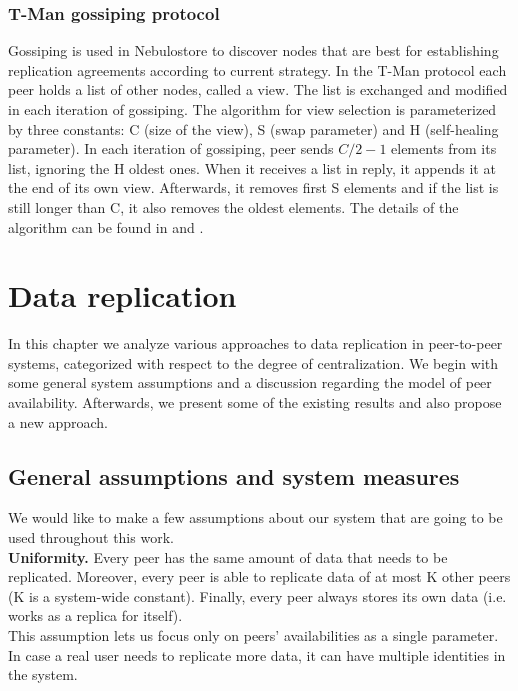 \documentclass{pracamgren}
\begin{document}
\subsection{T-Man gossiping protocol}

Gossiping is used in Nebulostore to discover nodes that are best for establishing replication agreements according to current strategy. In the T-Man protocol each peer holds a list of other nodes, called a view. The list is exchanged and modified in each iteration of gossiping. The algorithm for view selection is parameterized by three constants: C (size of the view), S (swap parameter) and H (self-healing parameter). In each iteration of gossiping, peer sends $C/2-1$ elements from its list, ignoring the H oldest ones. When it receives a list in reply, it appends it at the end of its own view. Afterwards, it removes first S elements and if the list is still longer than C, it also removes the oldest elements. The details of the algorithm can be found in \cite{gossiping} and \cite{tman}.\\


%
%
%
%

\chapter{Data replication}\label{chap:data_replication}

In this chapter we analyze various approaches to data replication in peer-to-peer systems, categorized with respect to the degree of centralization. We begin with some general system assumptions and a discussion regarding the model of peer availability. Afterwards, we present some of the existing results and also propose a new approach.\\

\section{General assumptions and system measures}\label{assumptions}

We would like to make a few assumptions about our system that are going to be used throughout this work.\\

{\bf Uniformity.} Every peer has the same amount of data that needs to be replicated. Moreover, every peer is able to replicate data of at most K other peers (K is a system-wide constant). Finally, every peer always stores its own data (i.e. works as a replica for itself).\\
This assumption lets us focus only on peers' availabilities as a single parameter. In case a real user needs to replicate more data, it can have multiple identities in the system.\\
\end{document}
